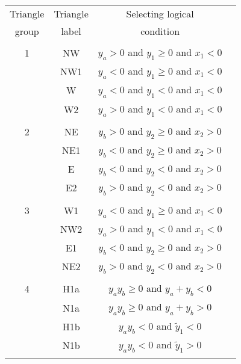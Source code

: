 \begin{table}
\begin{center}
\begin{tabular}{cccc}
\hline
Triangle  &  Triangle  &   Selecting logical                   \\
group     &   label    &   condition                           \\
\hline
          &        &            &                                       \\
1         &    NW      &  $y_a>0$ and $y_1\geq0$ and $x_1<0$ \\
          &    NW1     &  $y_a<0$ and $y_1\geq0$ and $x_1<0$ \\
          &    W       &  $y_a<0$ and $y_1<0$ and $x_1<0$    \\
          &    W2      &  $y_a>0$ and $y_1<0$ and $x_1<0$    \\
          &            &                                       \\
2         &    NE      &  $y_b>0$ and $y_2\geq0$ and $x_2>0$    \\
          &    NE1     &  $y_b<0$ and $y_2\geq0$ and $x_2>0$    \\
          &    E       &  $y_b<0$ and $y_2<0$ and $x_2>0$    \\
          &    E2      &  $y_b>0$ and $y_2<0$ and $x_2>0$    \\
          &            &                                       \\
3         &    W1      &  $y_a<0$ and $y_1\geq0$ and $x_1<0$ \\
          &    NW2     &  $y_a>0$ and $y_1<0$ and $x_1<0$    \\
          &    E1      &  $y_b<0$ and $y_2\geq0$ and $x_2>0$ \\
          &    NE2     &  $y_b>0$ and $y_2<0$ and $x_2>0$    \\
          &            &                                       \\
4         &    H1a     &  $y_a y_b\geq 0$ and $y_a+y_b<0$      \\
          &    N1a     &  $y_a y_b\geq 0$ and $y_a+y_b>0$      \\
          &    H1b     &  $y_a y_b<0$ and $\tilde{y}_1<0$      \\
          &    N1b     &  $y_a y_b<0$ and $\tilde{y}_1>0$      \\
          &            &                                       \\

\end{tabular}
\end{center}
\end{table}
